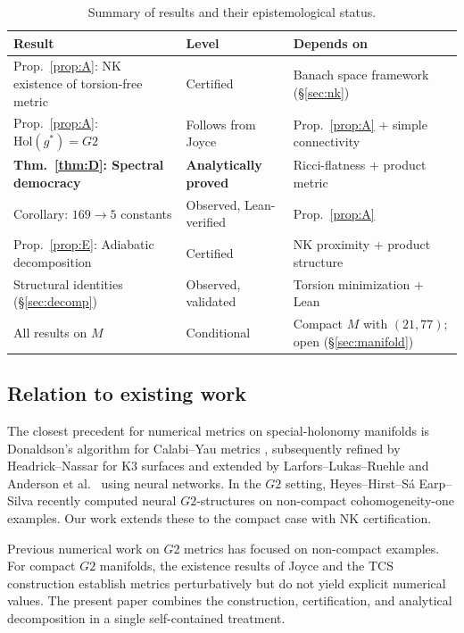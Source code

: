 \documentclass[11pt,a4paper]{article}
\theoremstyle{definition}
\theoremstyle{remark}
\newcommand{\Gtwo}{\mathrm{G}_2}
\def\Gtwo{G2}%
\begin{document}
\begin{table}[ht]
\centering
\small
\begin{tabular}{lll}
\toprule
Result & Level & Depends on \\
\midrule
Prop.~\ref{prop:A}: NK existence of torsion-free metric & Certified & Banach space framework (§\ref{sec:nk}) \\
Prop.~\ref{prop:A}: $\mathrm{Hol}(g^*) = \Gtwo$ & Follows from Joyce \cite{Joyce2000} & Prop.~\ref{prop:A} + simple connectivity \\
\textbf{Thm.~\ref{thm:D}: Spectral democracy} & \textbf{Analytically proved} & Ricci-flatness + product metric \\
Corollary: $169 \to 5$ constants & Observed, Lean-verified & Prop.~\ref{prop:A} \\
Prop.~\ref{prop:E}: Adiabatic decomposition & Certified & NK proximity + product structure \\
Structural identities (§\ref{sec:decomp}) & Observed, validated & Torsion minimization + Lean \\
All results on $M$ & Conditional & Compact $M$ with $(21, 77)$; open (§\ref{sec:manifold}) \\
\bottomrule
\end{tabular}
\caption{Summary of results and their epistemological status.}
\end{table}

\subsection{Relation to existing work}

The closest precedent for numerical metrics on special-holonomy manifolds is Donaldson's algorithm for Calabi--Yau metrics \cite{Donaldson2009}, subsequently refined by Headrick--Nassar \cite{HeadrickNassar2013} for K3 surfaces and extended by Larfors--Lukas--Ruehle \cite{LarforsLukasRuehle2022} and Anderson et al.\ \cite{Anderson2021} using neural networks. In the $\Gtwo$ setting, Heyes--Hirst--S\'a Earp--Silva \cite{HeyesHirst2026} recently computed neural $\Gtwo$-structures on non-compact cohomogeneity-one examples. Our work extends these to the compact case with NK certification.

Previous numerical work on $\Gtwo$ metrics has focused on non-compact examples. For compact $\Gtwo$ manifolds, the existence results of Joyce \cite{Joyce2000,JoyceII1996} and the TCS construction \cite{Kovalev2003,CHNP2015} establish metrics perturbatively but do not yield explicit numerical values. The present paper combines the construction, certification, and analytical decomposition in a single self-contained treatment.
\end{document}
